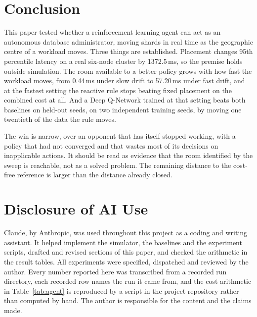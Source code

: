 \section{Conclusion}

This paper tested whether a reinforcement learning agent can act as an
autonomous database administrator, moving shards in real time as the
geographic centre of a workload moves. Three things are established. Placement
changes 95th percentile latency on a real six-node cluster by 1372.5\,ms, so
the premise holds outside simulation. The room available to a better policy
grows with how fast the workload moves, from 0.44\,ms under slow drift to
57.20\,ms under fast drift, and at the fastest setting the reactive rule stops
beating fixed placement on the combined cost at all. And a Deep Q-Network
trained at that setting beats both baselines on held-out seeds, on two
independent training seeds, by moving one twentieth of the data the rule
moves.

The win is narrow, over an opponent that has itself stopped working, with a
policy that had not converged and that wastes most of its decisions on
inapplicable actions. It should be read as evidence that the room identified
by the sweep is reachable, not as a solved problem. The remaining distance to
the cost-free reference is larger than the distance already closed.

\section*{Disclosure of AI Use}

Claude, by Anthropic, was used throughout this project as a coding and writing
assistant. It helped implement the simulator, the baselines and the experiment
scripts, drafted and revised sections of this paper, and checked the
arithmetic in the result tables. All experiments were specified, dispatched
and reviewed by the author. Every number reported here was transcribed from a
recorded run directory, each recorded row names the run it came from, and the
cost arithmetic in Table~\ref{tab:agent} is reproduced by a script in the
project repository rather than computed by hand. The author is responsible for
the content and the claims made.

